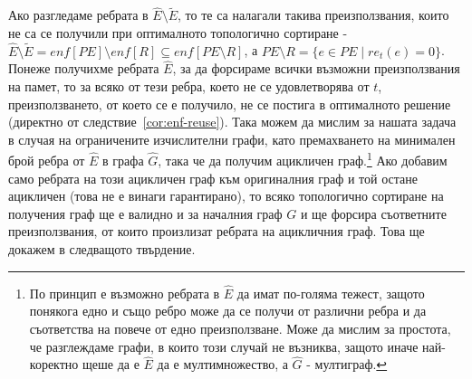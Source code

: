 \documentclass[12pt,twoside,a4paper]{article}
\begin{document}
	Ако разгледаме ребрата в $\hat{E} \setminus \tilde{E}$, то те са налагали такива преизползвания, които не са се получили при оптималното топологично сортиране - $\hat{E} \setminus \tilde{E} = enf[PE] \setminus enf[R] \subseteq enf[PE \setminus R]$, а $PE \setminus R = \{e \in PE \mid re_t(e)=0\}$. Понеже получихме ребрата $\hat{E}$, за да форсираме всички възможни преизползвания на памет, то за всяко от тези ребра, което не се удовлетворява от $t$, преизползването, от което се е получило, не се постига в оптималното решение (директно от следствие~\ref{cor:enf-reuse}). Така можем да мислим за нашата задача в случая на ограничените изчислителни графи, като премахването на минимален брой ребра от $\hat{E}$ в графа $\hat{G}$, така че да получим ацикличен граф.\footnote{По принцип е възможно ребрата в $\hat{E}$ да имат по-голяма тежест, защото понякога едно и също ребро може да се получи от различни ребра и да съответства на повече от едно преизползване. Може да мислим за простота, че разглеждаме графи, в които този случай не възниква, защото иначе най-коректно щеше да е $\hat{E}$ да е мултимножество, а $\hat{G}$ - мултиграф.} Ако добавим само ребрата на този ацикличен граф към оригиналния граф и той остане ацикличен (това не е винаги гарантирано), то всяко топологично сортиране на получения граф ще е валидно и за началния граф $G$ и ще форсира съответните преизползвания, от които произлизат ребрата на ацикличния граф. Това ще докажем в следващото твърдение.
	
\end{document}
